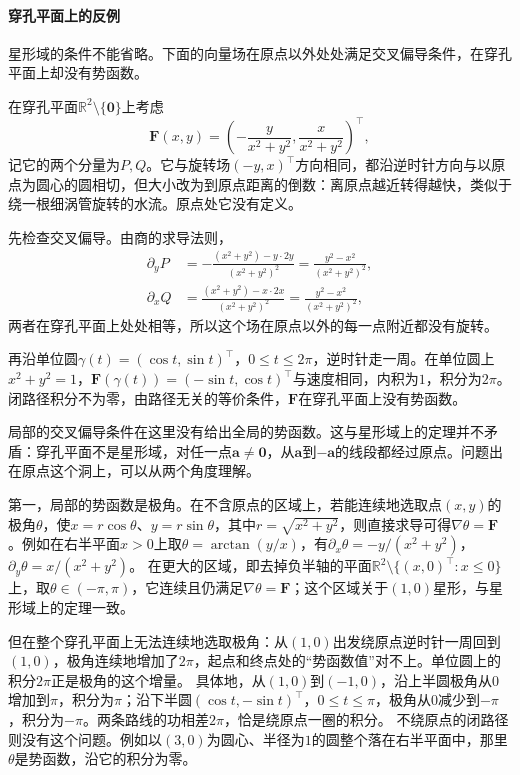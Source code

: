 \paragraph{穿孔平面上的反例}

星形域的条件不能省略。下面的向量场在原点以外处处满足交叉偏导条件，在穿孔平面上却没有势函数。
\begin{example}[穿孔平面上的涡旋场]
\label{ex:analysis-punctured-plane-vortex}
在穿孔平面$\mathbb R^2\setminus\{\bm0\}$上考虑
\[
 \bm F(x,y)=\left(-\frac{y}{x^2+y^2},\frac{x}{x^2+y^2}\right)^\top ,
\]
记它的两个分量为$P,Q$。它与旋转场$(-y,x)^\top$方向相同，都沿逆时针方向与以原点为圆心的圆相切，但大小改为到原点距离的倒数：离原点越近转得越快，类似于绕一根细涡管旋转的水流。原点处它没有定义。

先检查交叉偏导。由商的求导法则，
\[
 \begin{aligned}
 \partial_yP&=-\frac{(x^2+y^2)-y\cdot2y}{(x^2+y^2)^2}=\frac{y^2-x^2}{(x^2+y^2)^2},\\
 \partial_xQ&=\frac{(x^2+y^2)-x\cdot2x}{(x^2+y^2)^2}=\frac{y^2-x^2}{(x^2+y^2)^2},
 \end{aligned}
\]
两者在穿孔平面上处处相等，所以这个场在原点以外的每一点附近都没有旋转。

再沿单位圆$\gamma(t)=(\cos t,\sin t)^\top$，$0\leq t\leq2\pi$，逆时针走一周。在单位圆上$x^2+y^2=1$，$\bm F(\gamma(t))=(-\sin t,\cos t)^\top$与速度相同，内积为$1$，积分为$2\pi$。
闭路径积分不为零，由路径无关的等价条件，$\bm F$在穿孔平面上没有势函数。
\end{example}

局部的交叉偏导条件在这里没有给出全局的势函数。这与星形域上的定理并不矛盾：穿孔平面不是星形域，对任一点$\bm a\neq\bm0$，从$\bm a$到$-\bm a$的线段都经过原点。问题出在原点这个洞上，可以从两个角度理解。

第一，局部的势函数是极角。在不含原点的区域上，若能连续地选取点$(x,y)$的极角$\theta$，使$x=r\cos\theta$、$y=r\sin\theta$，其中$r=\sqrt{x^2+y^2}$，则直接求导可得$\nabla\theta=\bm F$。例如在右半平面$x>0$上取$\theta=\arctan(y/x)$，有$\partial_x\theta=-y/(x^2+y^2)$，$\partial_y\theta=x/(x^2+y^2)$。
在更大的区域，即去掉负半轴的平面$\mathbb R^2\setminus\{(x,0)^\top:x\leq0\}$上，取$\theta\in(-\pi,\pi)$，它连续且仍满足$\nabla\theta=\bm F$；这个区域关于$(1,0)$星形，与星形域上的定理一致。

但在整个穿孔平面上无法连续地选取极角：从$(1,0)$出发绕原点逆时针一周回到$(1,0)$，极角连续地增加了$2\pi$，起点和终点处的“势函数值”对不上。单位圆上的积分$2\pi$正是极角的这个增量。
具体地，从$(1,0)$到$(-1,0)$，沿上半圆极角从$0$增加到$\pi$，积分为$\pi$；沿下半圆$(\cos t,-\sin t)^\top$，$0\leq t\leq\pi$，极角从$0$减少到$-\pi$，积分为$-\pi$。两条路线的功相差$2\pi$，恰是绕原点一圈的积分。
不绕原点的闭路径则没有这个问题。例如以$(3,0)$为圆心、半径为$1$的圆整个落在右半平面中，那里$\theta$是势函数，沿它的积分为零。

